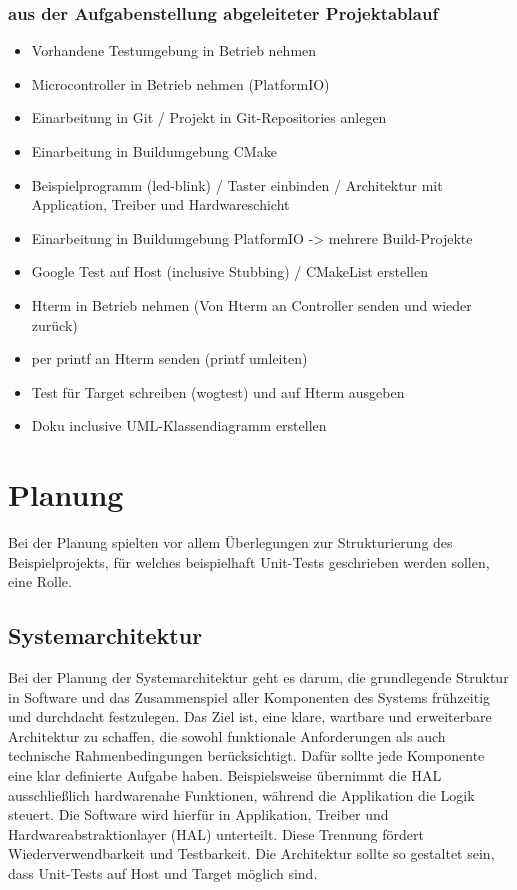 \documentclass[12pt,a4paper]{article}
\begin{document}
\newpage
\subsubsection{aus der Aufgabenstellung abgeleiteter Projektablauf}
\begin{itemize}
  \item Vorhandene Testumgebung in Betrieb nehmen
  \item Microcontroller in Betrieb nehmen (PlatformIO)
  \item Einarbeitung in Git / Projekt in Git-Repositories anlegen
  \item Einarbeitung in Buildumgebung CMake
  \item Beispielprogramm (led-blink) / Taster einbinden / Architektur mit Application, Treiber und Hardwareschicht
  \item Einarbeitung in Buildumgebung PlatformIO -> mehrere Build-Projekte
  \item Google Test auf Host (inclusive Stubbing) / CMakeList erstellen
  \item Hterm in Betrieb nehmen (Von Hterm an Controller senden und wieder zurück)
  \item per printf an Hterm senden (printf umleiten)
  \item Test für Target schreiben (wogtest) und auf Hterm ausgeben
  \item Doku inclusive UML-Klassendiagramm erstellen
\end{itemize}



\newpage

\section{Planung}
Bei der Planung spielten vor allem Überlegungen zur Strukturierung des Beispielprojekts, für welches beispielhaft Unit-Tests geschrieben werden sollen, eine Rolle.
\subsection{Systemarchitektur}
Bei der Planung der Systemarchitektur geht es darum, die grundlegende Struktur in Software und das Zusammenspiel aller Komponenten des Systems frühzeitig und durchdacht festzulegen.
Das Ziel ist, eine klare, wartbare und erweiterbare Architektur zu schaffen, die sowohl funktionale Anforderungen als auch technische Rahmenbedingungen berücksichtigt.
Dafür sollte jede Komponente eine klar definierte Aufgabe haben.
Beispielsweise übernimmt die HAL ausschließlich hardwarenahe Funktionen, während die Applikation die Logik steuert.
Die Software wird hierfür in Applikation, Treiber und Hardwareabstraktionlayer (HAL) unterteilt. Diese Trennung fördert Wiederverwendbarkeit und Testbarkeit.
Die Architektur sollte so gestaltet sein, dass Unit-Tests auf Host und Target möglich sind.
\end{document}
